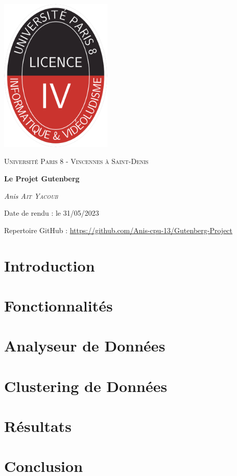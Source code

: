 \documentclass[a4paper,14pt,french]{report}
\begin{document}
\begin{titlepage}
    \centering
    \includegraphics[width=0.4\textwidth]{logo.png}\par\vspace{1cm}
    {\scshape\Large Université Paris 8 - Vincennes à Saint-Denis\par}
    \vspace{1cm}
    {\huge\bfseries Le Projet Gutenberg\par}
    \vspace{1.5cm}
    {\Large\textit{Anis \textsc{Ait Yacoub}}\par}
    \vfill
    Date de rendu : le 31/05/2023\par\vspace{1.75cm}
    Repertoire GitHub : \url{https://github.com/Anis-cpu-13/Gutenberg-Project}
\end{titlepage}


\tableofcontents

\chapter{Introduction}
\label{ch:introduction}


\chapter{Fonctionnalités}
\label{ch:chapitre1}


\chapter{Analyseur de Données}
\label{ch:chapitre2}


\chapter{Clustering de Données}
\label{ch:chapitre3}


\chapter{Résultats}
\label{ch:chapitre4}


\chapter{Conclusion}
\label{ch:conclusion}

\end{document}
